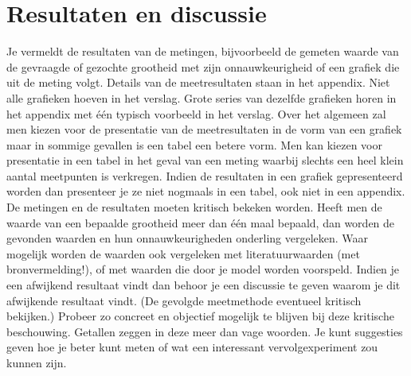 \section{Resultaten en discussie}
Je vermeldt de resultaten van de metingen, bijvoorbeeld de gemeten waarde van de gevraagde of
gezochte grootheid met zijn onnauwkeurigheid of een grafiek die uit de meting volgt. 
Details van
de meetresultaten staan in het appendix. 
Niet alle grafieken hoeven in het verslag. 
Grote series van dezelfde grafieken horen in het appendix met één typisch voorbeeld in het verslag. Over het algemeen zal men kiezen voor de presentatie van de meetresultaten in de vorm van een grafiek maar in sommige gevallen is een tabel een betere vorm. 
Men kan kiezen voor presentatie in een tabel in het geval van een meting waarbij slechts een heel klein aantal meetpunten is verkregen.
Indien de resultaten in een grafiek gepresenteerd worden dan presenteer je ze niet nogmaals in
een tabel, ook niet in een appendix.
De metingen en de resultaten moeten kritisch bekeken worden. 
Heeft men de waarde van een bepaalde grootheid meer dan één maal bepaald, dan worden de gevonden waarden en hun onnauwkeurigheden onderling vergeleken. 
Waar mogelijk worden de waarden ook vergeleken met literatuurwaarden (met bronvermelding!), of met waarden die door je model worden voorspeld. 
Indien je een afwijkend resultaat vindt dan behoor je een discussie te geven waarom je dit afwijkende resultaat vindt. 
(De gevolgde meetmethode eventueel kritisch bekijken.) 
Probeer zo concreet en objectief mogelijk te blijven bij deze kritische beschouwing. 
Getallen zeggen in deze meer dan vage woorden. 
Je kunt suggesties geven hoe je beter kunt meten of wat een interessant vervolgexperiment zou kunnen zijn.